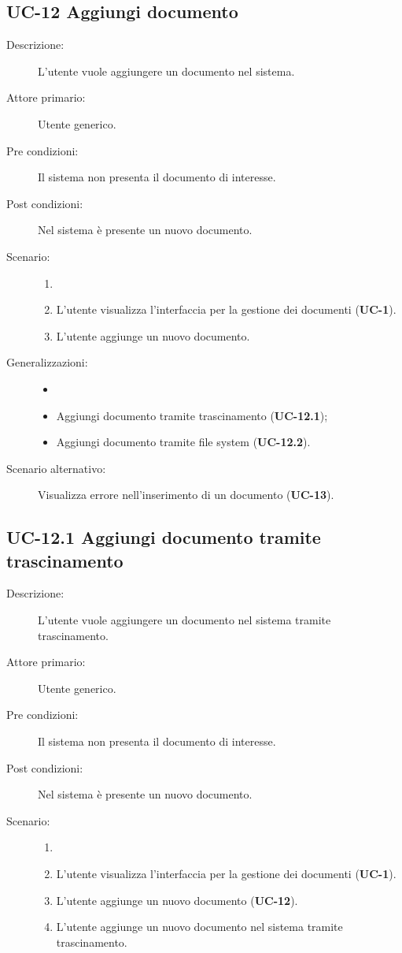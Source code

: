 \subsection{UC-12 Aggiungi documento}
\begin{description}
    \item[Descrizione:] L'utente vuole aggiungere un documento nel sistema.
    \item[Attore primario:] Utente generico.
    \item[Pre condizioni:] Il sistema non presenta il documento di interesse.
    \item[Post condizioni:] Nel sistema è presente un nuovo documento.
    \item[Scenario:]
    \begin{enumerate}
        \item[] 
        \item L’utente visualizza l'interfaccia per la gestione dei documenti (\textbf{UC-1}).
        \item L’utente aggiunge un nuovo documento.
    \end{enumerate}
    \item[Generalizzazioni:] 
    \begin{itemize}
        \item[] 
        \item Aggiungi documento tramite trascinamento (\textbf{UC-12.1});
        \item Aggiungi documento tramite file system (\textbf{UC-12.2}).
    \end{itemize} 
    \item[Scenario alternativo:] Visualizza errore nell'inserimento di un documento (\textbf{UC-13}).
\end{description}

\subsection{UC-12.1 Aggiungi documento tramite trascinamento}
\begin{description}
    \item[Descrizione:] L'utente vuole aggiungere un documento nel sistema tramite trascinamento.
    \item[Attore primario:] Utente generico.
    \item[Pre condizioni:] Il sistema non presenta il documento di interesse.
    \item[Post condizioni:] Nel sistema è presente un nuovo documento.
    \item[Scenario:] 
    \begin{enumerate}
        \item[] 
        \item L’utente visualizza l'interfaccia per la gestione dei documenti (\textbf{UC-1}).
        \item L’utente aggiunge un nuovo documento (\textbf{UC-12}).
        \item L'utente aggiunge un nuovo documento nel sistema tramite trascinamento.
    \end{enumerate}
\end{description}

